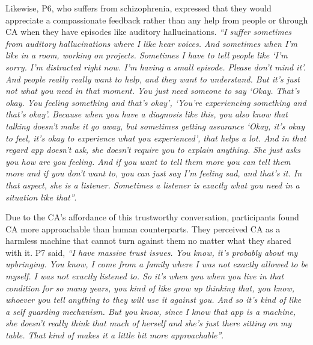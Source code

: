             Likewise, P6, who suffers from schizophrenia, expressed that they would appreciate a compassionate feedback rather than any help from people or through \ac{CA} when they have episodes like auditory hallucinations.
                \textit{``I suffer sometimes from auditory hallucinations where I like hear voices. And sometimes when I'm like in a room, working on projects. Sometimes I have to tell people like `I'm sorry. I'm distracted right now. I'm having a small episode. Please don't mind it'. And people really really want to help, and they want to understand. But it's just not what you need in that moment. You just need someone to say `Okay. That's okay. You feeling something and that's okay', `You're experiencing something and that's okay'. Because when you have a diagnosis like this, you also know that talking doesn't make it go away, but sometimes getting assurance `Okay, it's okay to feel, it's okay to experience what you experienced', that helps a lot. And in that regard \acl{app} doesn't ask, she doesn't require you to explain anything. She just asks you how are you feeling. And if you want to tell them more you can tell them more and if you don't want to, you can just say I'm feeling sad, and that's it. In that aspect, she is a listener. Sometimes a listener is exactly what you need in a situation like that''}.

            Due to the \ac{CA}'s affordance of this trustworthy conversation, participants found \ac{CA} more approachable than human counterparts. They perceived \ac{CA} as a harmless machine that cannot turn against them no matter what they shared with it. P7 said,
                \textit{``I have massive trust issues. You know, it's probably about my upbringing. You know, I come from a family where I was not exactly allowed to be myself. I was not exactly listened to. So it's when you when you live in that condition for so many years, you kind of like grow up thinking that, you know, whoever you tell anything to they will use it against you. And so it's kind of like a self guarding mechanism. But you know, since I know that \acl{app} is a machine, she doesn't really think that much of herself and she's just there sitting on my table. That kind of makes it a little bit more approachable''}.

